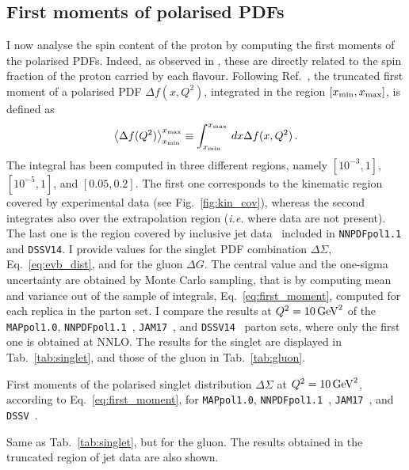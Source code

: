 \subsection{First moments of polarised PDFs}
I now analyse the spin content of the proton by computing the first moments of the polarised PDFs. Indeed, as observed in , these are directly related to the spin fraction of the proton carried by each flavour. Following Ref.~\cite{Nocera:2014gqa}, the truncated first moment of a polarised PDF $\Delta f (x,Q^2)$, integrated in the region $[x_{\textrm{min}}, x_{\textrm{max}}]$, is defined as
\begin{equation}
  \left< \Delta f (Q^2) \right>^{x_{\textrm{max}}}_{x_{\textrm{min}}} \equiv \int^{x_{\textrm{max}}}_{x_{\textrm{min}}} \, dx \Delta f (x,Q^2) \,.
  \label{eq:first_moment}
\end{equation}
The integral has been computed in three different regions, namely $[10^{-3},1]$, $[10^{-5},1]$, and $[0.05, 0.2]$. The first one corresponds to the kinematic region covered by experimental data (see Fig.~\ref{fig:kin_cov}), whereas the second integrates also over the extrapolation region (\textit{i.e.} where data are not present). The last one is the region covered by inclusive jet data~\cite{Nocera:2014gqa} included in \texttt{NNPDFpol1.1} and \texttt{DSSV14}. I provide values for the singlet PDF combination $\Delta \Sigma$, Eq.~\eqref{eq:evb_dist}, and for the gluon $\Delta G$. The central value and the one-sigma uncertainty are obtained by Monte Carlo sampling, that is by computing mean and variance out of the sample of integrals, Eq.~\eqref{eq:first_moment}, computed for each replica in the parton set.
I compare the results at $Q^2 = 10 \, \textrm{GeV}^2$ of the \texttt{MAPpol1.0}, \texttt{NNPDFpol1.1}~\cite{Nocera:2014gqa}, \texttt{JAM17}~\cite{Ethier:2017zbq}, and \texttt{DSSV14}~\cite{DeFlorian:2019xxt} parton sets, where only the first one is obtained at NNLO. The results for the singlet are displayed in Tab.~\ref{tab:singlet}, and those of the gluon in Tab.~\ref{tab:gluon}.
\begin{table}[t]
  \centering 
  \small
  
  \caption{
    \small
    First moments of the polarised singlet distribution $\Delta \Sigma$ at $Q^2 = 10 \, \textrm{GeV}^2$, according to Eq.~\eqref{eq:first_moment}, for \texttt{MAPpol1.0}, \texttt{NNPDFpol1.1}~\cite{Nocera:2014gqa}, \texttt{JAM17}~\cite{Ethier:2017zbq}, and \texttt{DSSV}~\cite{DeFlorian:2019xxt}.
  \label{tab:singlet}}
\end{table}
\begin{table}[t]
  \centering 
  \small
  
  \caption{
    \small
    Same as Tab.~\ref{tab:singlet}, but for the gluon. The results obtained in the truncated region of jet data are also shown.
  \label{tab:gluon}}
\end{table}

